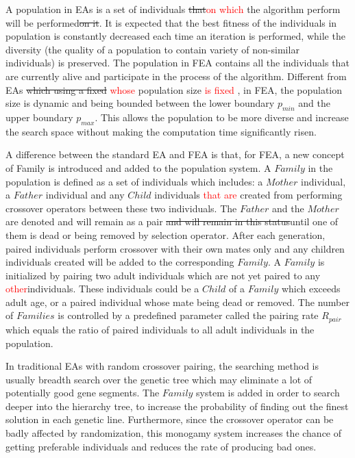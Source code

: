 \documentclass[final]{elsarticle}
\begin{document}
A population in EAs is a set of individuals \sout{that}\textcolor{red}{on which} the algorithm perform will be performed\sout{on it}. It is expected that the best fitness of the individuals in population is constantly decreased each time an iteration is performed, while the diversity (the quality of a population to contain variety of non-similar individuals) is preserved. The population in FEA contains all the individuals that are currently alive and participate in the process of the algorithm. Different from EAs \sout{which using a fixed }\textcolor{red}{whose }population size \textcolor{red}{is fixed} , in FEA, the population size is dynamic and being bounded between the lower boundary $p_{min}$ and the upper boundary $p_{max}$. This allows the population to be more diverse and increase the search space without making the computation time significantly risen.

A difference between the standard EA and FEA is that, for FEA, a new concept of Family is introduced and added to the population system. A $ Family $ in the population is defined as a set of individuals which includes: a $ Mother $ individual, a $ Father $ individual and any $ Child $ individuals \textcolor{red}{that are} created from performing crossover operators between these two individuals. The $ Father $ and the $ Mother $ are denoted and will remain as a pair \sout{and will remain in this status}until one of them is dead or being removed by selection operator. After each generation, paired individuals perform crossover with their own mates only and any children individuals created will be added to the corresponding $ Family $. A $ Family $ is initialized by pairing two adult individuals which are not yet paired to any \textcolor{red}{other}individuals. These individuals could be a $ Child $ of a $ Family $ which exceeds adult age, or a paired individual whose mate being dead or removed. The number of $ Families $ is controlled by a predefined parameter called the pairing rate $R_{pair}$ which equals the ratio of paired individuals to all adult individuals in the population.

In traditional EAs with random crossover pairing, the searching method is usually breadth search over the genetic tree which may eliminate a lot of potentially good gene segments. The $ Family $ system is added in order to search deeper into the hierarchy tree, to increase the probability of finding out the finest solution in each genetic line. Furthermore, since the crossover operator can be badly affected by randomization, this monogamy system increases the chance of getting preferable individuals and reduces the rate of producing bad ones. 
\end{document}
